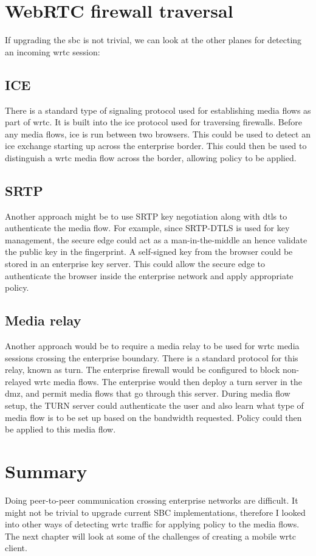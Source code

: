 \section{WebRTC firewall traversal}
If upgrading the \gls{sbc} is not trivial, we can look at the other planes for detecting an incoming \gls{wrtc} session:

\subsection{ICE}
There is a standard type of signaling protocol used for establishing media flows as part of \gls{wrtc}. It is built into the \gls{ice} protocol used for traversing firewalls. Before any media flows, \gls{ice} is run between two browsers. This could be used to detect an \gls{ice} exchange starting up across the enterprise border. This could then be used to distinguish a \gls{wrtc} media flow across the border, allowing policy to be applied.

\subsection{SRTP}
Another approach might be to use SRTP key negotiation along with \gls{dtls} to authenticate the media flow. For example, since SRTP-DTLS is used for key management, the secure edge could act as a man-in-the-middle an hence validate the public key in the fingerprint. A self-signed key from the browser could be stored in an enterprise key server. This could allow the secure edge to authenticate the browser inside the enterprise network and apply appropriate policy.

\subsection{Media relay}
Another approach would be to require a media relay to be used for \gls{wrtc} media sessions crossing the enterprise boundary. There is a standard protocol for this relay, known as \gls{turn}. The enterprise firewall would be configured to block non-relayed \gls{wrtc} media flows. The enterprise would then deploy a \gls{turn} server in the \gls{dmz}, and permit media flows that go through this server. During media flow setup, the TURN server could authenticate the user and also learn what type of media flow is to be set up based on the bandwidth requested. Policy could then be applied to this media flow.

\section{Summary}
Doing peer-to-peer communication crossing enterprise networks are difficult. It might not be trivial to upgrade current SBC implementations, therefore I looked into other ways of detecting \gls{wrtc} traffic for applying policy to the media flows. The next chapter will look at some of the challenges of creating a mobile \gls{wrtc} client.